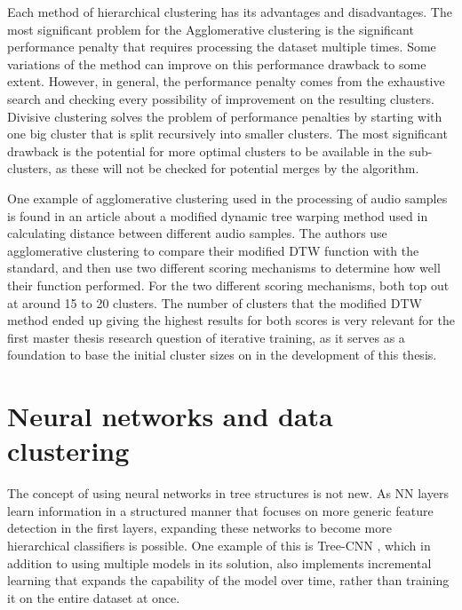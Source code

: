 Each method of hierarchical clustering has its advantages and disadvantages. The most significant problem for the Agglomerative clustering is the significant performance penalty that requires processing the dataset multiple times. Some variations of the method can improve on this performance drawback to some extent. However, in general, the performance penalty comes from the exhaustive search and checking every possibility of improvement on the resulting clusters. Divisive clustering solves the problem of performance penalties by starting with one big cluster that is split recursively into smaller clusters. The most significant drawback is the potential for more optimal clusters to be available in the sub-clusters, as these will not be checked for potential merges by the algorithm.

One example of agglomerative clustering used in the processing of audio samples is found in an article about a modified dynamic tree warping method used in calculating distance between different audio samples\cite{ClusterExample}. The authors use agglomerative clustering to compare their modified DTW function with the standard, and then use two different scoring mechanisms to determine how well their function performed. For the two different scoring mechanisms, both top out at around 15 to 20 clusters. The number of clusters that the modified DTW method ended up giving the highest results for both scores is very relevant for the first master thesis research question of iterative training, as it serves as a foundation to base the initial cluster sizes on in the development of this thesis.


\section{Neural networks and data clustering}
The concept of using neural networks in tree structures is not new. As NN layers learn information in a structured manner that focuses on more generic feature detection in the first layers, expanding these networks to become more hierarchical classifiers is possible. One example of this is Tree-CNN \cite{roy2018treecnn}, which in addition to using multiple models in its solution, also implements incremental learning that expands the capability of the model over time, rather than training it on the entire dataset at once.

